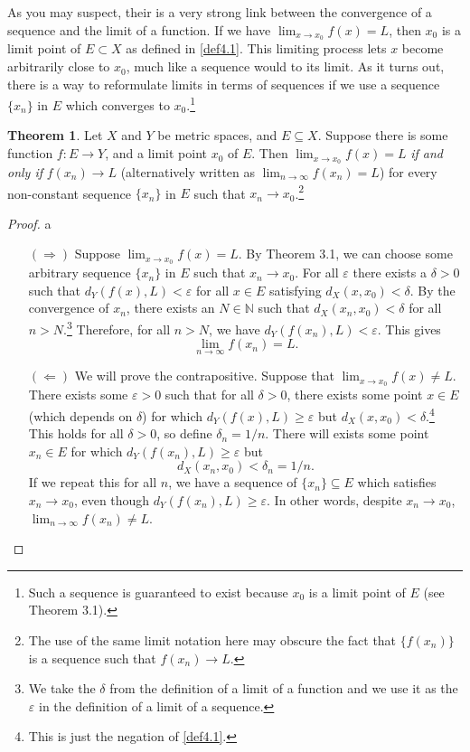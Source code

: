 \documentclass{article}
\newcommand{\N}{\mathbb{N}}
\theoremstyle{definition}
\newtheorem{theorem}{Theorem}[section]
\begin{document}
	As you may suspect, their is a very strong link between the convergence of a sequence and the limit of a function. If we have $ \lim_{x\to x_0}f(x)=L $, then $ x_0 $ is a limit point of $ E\subset X $ as defined in \cref{def4.1}. This limiting process lets $ x $ become arbitrarily close to $ x_0 $, much like a sequence would to its limit. As it turns out, there is a way to reformulate limits in terms of sequences if we use a sequence $ \{x_n\} $ in $ E $ which converges to $ x_0 $.\footnote{Such a sequence is guaranteed to exist because $ x_0 $ is a limit point of $ E $ (see Theorem 3.1).}
	\begin{theorem}
		Let $ X $ and $ Y $ be metric spaces, and $ E\subseteq X $. Suppose there is some function $ f:E\to Y $, and a limit point $ x_0 $ of $ E $. Then $ \lim_{x\to x_0}f(x)=L $ \textit{if and only if} $ f(x_n)\to L $ (alternatively written as $ \lim_{n\to\infty}f(x_n)=L $) for every non-constant sequence $ \{x_n\} $ in $ E $ such that $ x_n\to x_0 $.\footnote{The use of the same limit notation here may obscure the fact that $ \{f(x_n)\} $ is a sequence such that $ f(x_n)\to L $. } 
	\end{theorem} 
	\begin{proof}
		{\color{white}a}
		\begin{enumerate}
			\item [$ (\Longrightarrow) $] Suppose $ \lim_{x\to x_0}f(x)=L $. By Theorem 3.1, we can choose some arbitrary sequence $ \{x_n\} $ in $ E $ such that $ x_n\to x_0 $. For all $ \varepsilon $ there exists a $ \delta>0 $ such that $ d_Y(f(x),L)<\varepsilon$ for all $ x\in E $ satisfying $ d_X(x,x_0)<\delta $. By the convergence of $ x_n $, there exists an $ N\in\N $ such that $ d_X(x_n,x_0)<\delta $ for all $ n>N $.\footnote{We take the $ \delta $ from the definition of a limit of a function and we use it as the $ \varepsilon $ in the definition of a limit of a sequence.} Therefore, for all $ n>N $, we have $d_Y(f(x_n),L)<\varepsilon$. This gives $$\lim_{n\to\infty}f(x_n)=L .$$
			\item [$ (\Longleftarrow) $] We will prove the contrapositive. Suppose that $ \lim_{x\to x_0}f(x)\neq L $. There exists some $ \varepsilon>0 $ such that for all $ \delta>0 $, there exists some point $ x\in E $ (which depends on $ \delta $) for which $ d_Y(f(x),L)\ge\varepsilon $ but $ d_X(x,x_0)<\delta $.\footnote{This is just the negation of \cref{def4.1}.} This holds for all $\delta > 0$, so define $\delta_n = 1/n$. There will exists some point $x_n \in E$ for which $d_Y(f(x_n), L) \ge \varepsilon$ but 
			$$d_X(x_n,x_0) <\delta_n = 1/n.$$ If we repeat this for all $n$, we have a sequence of $\{x_n\}\subseteq E$ which satisfies $x_n \to x_0$, even though $d_Y(f(x_n), L) \ge \varepsilon$. In other words, despite $x_n\to x_0$, $\lim_{n\to \infty}f(x_n)\neq L$.
		\end{enumerate}
	\end{proof}
\end{document}
